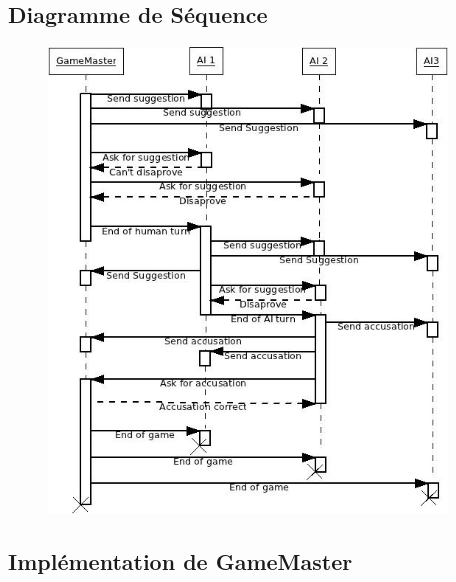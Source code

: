 \documentclass[a4paper,10pt]{article}
\begin{document}
	\subsection{Diagramme de Séquence}\hypertarget{seqDiag}{}
		\begin{figure}[H] \hspace*{-2cm} 
    	\centering
   		  \includegraphics[width=300pt]{Diag-Sequence.jpeg} 
	  	\end{figure}	 
	 


 \subsection{Implémentation de GameMaster} 	\hypertarget{GameMasterImplementation}{}
\end{document}
